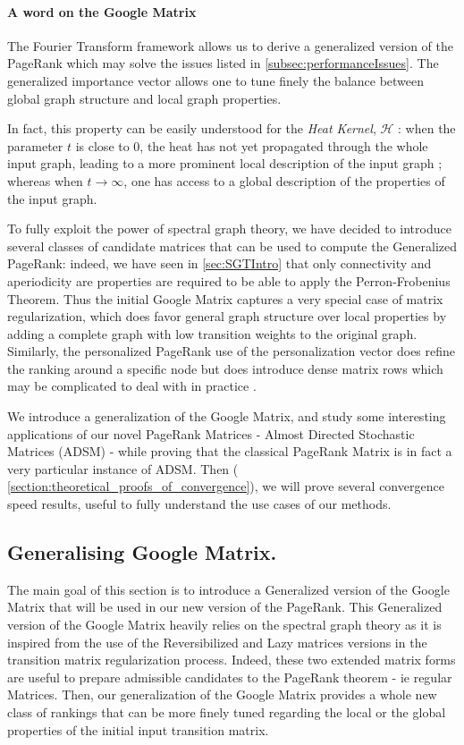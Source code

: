\documentclass[sn-mathphys]{sn-jnl}%
\theoremstyle{thmstyleone}%
\theoremstyle{thmstyletwo}%
\theoremstyle{thmstylethree}%
\begin{document}
\paragraph{A word on the Google Matrix}\label{subsec:main_consequences}
The Fourier Transform framework allows us to derive a generalized
version of the PageRank which may solve the issues listed in
\ref{subsec:performanceIssues}. The generalized importance vector
allows one to tune finely the balance between global graph structure
and local graph properties.

In fact, this property can be easily understood for the \textit{Heat
  Kernel}, $\mathcal{H}$ : when the parameter $t$ is close to 0, the
heat has not yet propagated through the whole input graph, leading to
a more prominent local description of the input graph ; whereas when
$t \rightarrow \infty$, one has access to a global description of the
properties of the input graph.


To fully exploit the power of spectral graph theory, we have decided
to introduce several classes of candidate matrices that can be used to
compute the Generalized PageRank: indeed, we have seen in
\ref{sec:SGTIntro} that only connectivity and aperiodicity are
properties are required to be able to apply the Perron-Frobenius
Theorem. Thus the initial Google Matrix captures a very special case
of matrix regularization, which does favor general graph structure
over local properties by adding a complete graph with low transition
weights to the original graph. Similarly, the personalized PageRank
use of the personalization vector does refine the ranking around a
specific node but does introduce dense matrix rows which may be
complicated to deal with in practice \cite{langville_meyer_2004}.

We introduce a generalization of the Google Matrix, and study some
interesting applications of our novel PageRank Matrices - Almost
Directed Stochastic Matrices (ADSM) - while proving that the classical
PageRank Matrix is in fact a very particular instance of ADSM. Then (
\ref{section:theoretical_proofs_of_convergence}), we will prove
several convergence speed results, useful to fully understand the use
cases of our methods.

\subsection{Generalising Google Matrix.}
The main goal of this section is to introduce a Generalized version of
the Google Matrix that will be used in our new version of the
PageRank.  This Generalized version of the Google Matrix heavily
relies on the spectral graph theory as it is inspired from the use of
the Reversibilized and Lazy matrices versions in the transition matrix
regularization process. Indeed, these two extended matrix forms are
useful to prepare admissible candidates to the PageRank theorem - ie
regular Matrices. Then, our generalization of the Google Matrix
provides a whole new class of rankings that can be more finely tuned
regarding the local or the global properties of the initial input
transition matrix.
\end{document}
